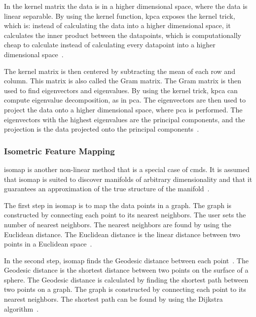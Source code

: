 In the kernel matrix the data is in a higher dimensional space, where the data is linear separable. By using the kernel function, \gls{kpca} exposes the kernel trick, which is: instead of calculating the data into a higher dimensional space, it calculates the inner product between the datapoints, which is computationally cheap to calculate instead of calculating every datapoint into a higher dimensional space~\cite{kernel-pca}.

The kernel matrix is then centered by subtracting the mean of each row and column. This matrix is also called the Gram matrix. The Gram matrix is then used to find eigenvectors and eigenvalues. By using the kernel trick, \gls{kpca} can compute eigenvalue decomposition, as in \gls{pca}. The eigenvectors are then used to project the data onto a higher dimensional space, where \gls{pca} is performed. The eigenvectors with the highest eigenvalues are the principal components, and the projection is the data projected onto the principal components~\cite{kernel-pca}.

\subsubsection{Isometric Feature Mapping}\label{subsubsec:isometric-feature-mapping}
\gls{isomap} is another non-linear method that is a special case of \gls{cmds}. It is assumed that \gls{isomap} is suited to discover manifolds of arbitrary dimensionality and that it guarantees an approximation of the true structure of the manifold~\cite{tennenbaum}.

The first step in \gls{isomap} is to map the data points in a graph. The graph is constructed by connecting each point to its nearest neighbors. The user sets the number of nearest neighbors. The nearest neighbors are found by using the Euclidean distance. The Euclidean distance is the linear distance between two points in a Euclidean space~\cite{Multidimensional-Scaling-Sammon-Mapping-and-Isomap}.

In the second step, \gls{isomap} finds the Geodesic distance between each point~\cite{Multidimensional-Scaling-Sammon-Mapping-and-Isomap}. The Geodesic distance is the shortest distance between two points on the surface of a sphere. The Geodesic distance is calculated by finding the shortest path between two points on a graph. The graph is constructed by connecting each point to its nearest neighbors. The shortest path can be found by using the Dijkstra algorithm~\cite{multi-dimensional-scaling-leeuw}.

